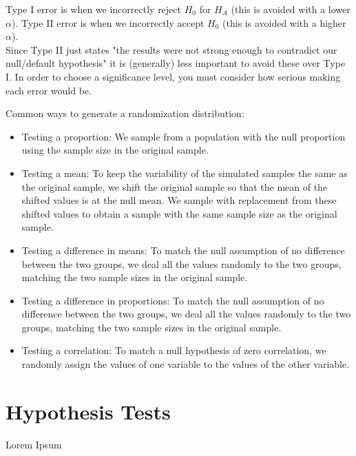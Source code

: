 \documentclass[12pt]{article}
\begin{document}
\begin{tcolorbox}[title=Errors]
    Type I error is when we incorrectly reject $H_0$ for $H_A$ (this is avoided with a lower $\alpha$). Type II error is when we incorrectly accept $H_0$ (this is avoided with a higher $\alpha$).\\
    Since Type II just states "the results were not strong enough to contradict our null/default hypothesis" it is (generally) less important to avoid these over Type I. In order to choose a significance level, you must consider
    how serious making each error would be.
\end{tcolorbox}

\begin{tcolorbox}[title=Methods for Generating a Randomization Distribution]
    Common ways to generate a randomization distribution:
    \begin{itemize}
        \item Testing a proportion: We sample from a population with the null proportion using the sample size in the original sample.
        \item Testing a mean: To keep the variability of the simulated samples the same as the original sample, we shift the original sample so that the mean of the shifted values is at the null mean. We sample with replacement from these shifted values to obtain a sample with the same sample size as the original sample.
        \item Testing a difference in means: To match the null assumption of no difference between the two groups, we deal all the values randomly to the two groups, matching the two sample sizes in the original sample.
        \item Testing a difference in proportions: To match the null assumption of no difference between the two groups, we deal all the values randomly to the two groups, matching the two sample sizes in the original sample.
        \item Testing a correlation: To match a null hypothesis of zero correlation, we randomly assign the values of one variable to the values of the other variable.
    \end{itemize}
\end{tcolorbox}

\pagebreak
\section{Hypothesis Tests}
Lorem Ipsum \\

\end{document}
